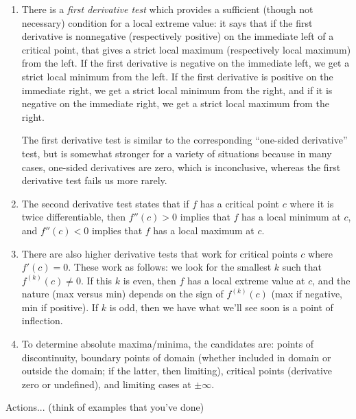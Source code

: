 \documentclass[10pt]{amsart}
\begin{document}
\begin{enumerate}
  {\em Note: Due to an oversight, the remaining items in this list
  were not included in the executive summary to the lecture notes.}

\item There is a {\em first derivative test} which provides a
  sufficient (though not necessary) condition for a local extreme
  value: it says that if the first derivative is nonnegative
  (respectively positive) on the immediate left of a critical point,
  that gives a strict local maximum (respectively local maximum) from
  the left. If the first derivative is negative on the immediate left,
  we get a strict local minimum from the left. If the first derivative
  is positive on the immediate right, we get a strict local minimum
  from the right, and if it is negative on the immediate right, we get
  a strict local maximum from the right.

  The first derivative test is similar to the corresponding
  ``one-sided derivative'' test, but is somewhat stronger for a
  variety of situations because in many cases, one-sided derivatives
  are zero, which is inconclusive, whereas the first derivative test
  fails us more rarely.
\item The second derivative test states that if $f$ has a critical
  point $c$ where it is twice differentiable, then $f''(c) > 0$
  implies that $f$ has a local minimum at $c$, and $f''(c) < 0$
  implies that $f$ has a local maximum at $c$.
\item There are also higher derivative tests that work for critical
  points $c$ where $f'(c) = 0$. These work as follows: we look for the
  smallest $k$ such that $f^{(k)}(c) \ne 0$. If this $k$ is even, then
  $f$ has a local extreme value at $c$, and the nature (max versus
  min) depends on the sign of $f^{(k)}(c)$ (max if negative, min if
  positive). If $k$ is odd, then we have what we'll see soon is a
  point of inflection.
\item To determine absolute maxima/minima, the candidates are: points
  of discontinuity, boundary points of domain (whether included in
  domain or outside the domain; if the latter, then limiting),
  critical points (derivative zero or undefined), and limiting cases
  at $\pm \infty$.
\end{enumerate}

Actions... (think of examples that you've done)
\end{document}
